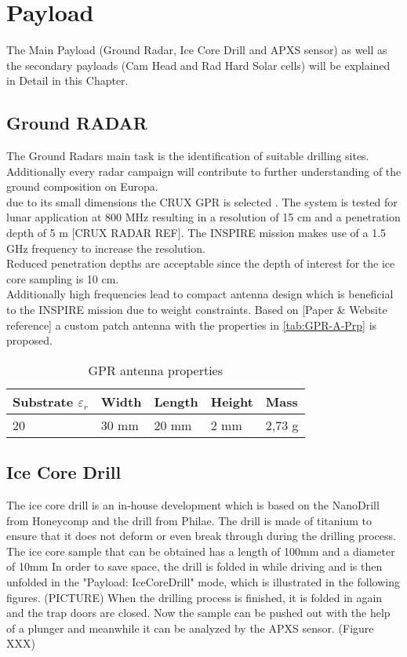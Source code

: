 
\chapter{Payload}
\label{chap:payload}

The Main Payload (Ground Radar, Ice Core Drill and APXS sensor) as well as the secondary payloads (Cam Head and Rad Hard Solar cells) will be explained in Detail in this Chapter.

\section{Ground RADAR}
The Ground Radars main task is the identification of suitable drilling sites. Additionally every radar campaign will contribute to further understanding of the ground composition on Europa.\\

due to its small dimensions the CRUX GPR is selected . The system is tested for lunar application at 800 MHz resulting in a resolution of 15 cm and a penetration depth of 5 m [CRUX RADAR REF]. The INSPIRE mission makes use of a 1.5 GHz frequency to increase the resolution. \\
Reduced penetration depths are acceptable since the depth of interest for the ice core sampling is 10 cm. \\

Additionally high frequencies lead to compact antenna design which is beneficial to the INSPIRE mission due to weight constraints. 
Based on [Paper \& Website reference] a custom patch antenna with the properties in \autoref{tab:GPR-A-Prp} is proposed.

\begin{table}[h]
\centering
\begin{tabular}{lllll}
\toprule
Substrate ${\varepsilon}_{r}$ & Width & Length & Height & Mass   \\
\midrule
20                         & 30 mm & 20 mm  & 2 mm   & 2,73 g  \\
\bottomrule
\end{tabular}
\caption{GPR antenna properties}
\label{tab:GPR-A-Prp}
\end{table}

\section{Ice Core Drill}

The ice core drill is an in-house development which is based on the NanoDrill from Honeycomp and the drill from Philae. The drill is made of titanium to ensure that it does not deform or even break through during the drilling process.
The ice core sample that can be obtained has a length of 100mm and a diameter of 10mm
In order to save space, the drill is folded in while driving and is then unfolded in the "Payload: IceCoreDrill" mode, which is illustrated in the following figures. (PICTURE)
When the drilling process is finished, it is folded in again and the trap doors are closed.
Now the sample can be pushed out with the help of a plunger and meanwhile it can be analyzed by the APXS sensor. (Figure XXX)

